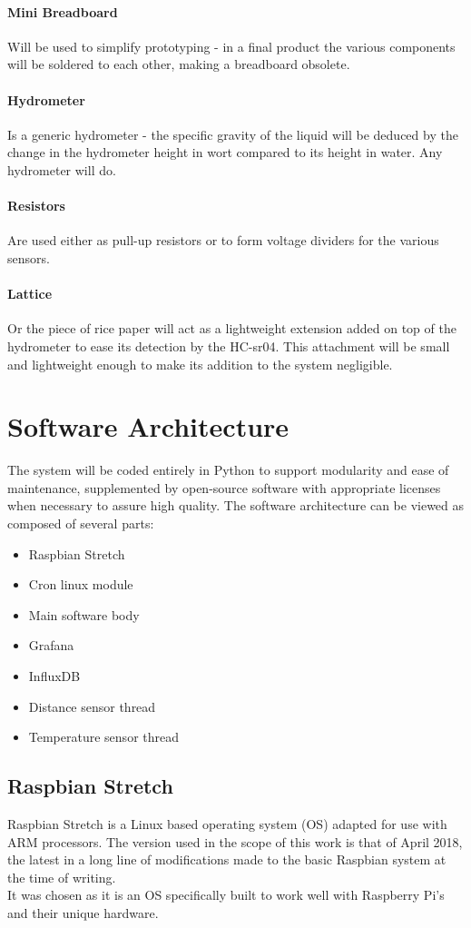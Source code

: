 \documentclass[twoside]{ctuthesis}
\theoremstyle{plain}
\theoremstyle{definition}
\theoremstyle{note}
\begin{document}
\paragraph{Mini Breadboard} Will be used to simplify prototyping - in a final product the various components will be soldered to each other, making a breadboard obsolete.
\paragraph{Hydrometer} Is a generic hydrometer - the specific gravity of the liquid will be deduced by the change in the hydrometer height in wort compared to its height in water. Any hydrometer will do.
\paragraph{Resistors} Are used either as pull-up resistors or to form voltage dividers for the various sensors.
\paragraph{Lattice} Or the piece of rice paper will act as a lightweight extension added on top of the hydrometer to ease its detection by the HC-sr04. This attachment will be small and lightweight enough to make its addition to the system negligible.

\section{Software Architecture}
The system will be coded entirely in Python to support modularity and ease of maintenance, supplemented by open-source software with appropriate licenses when necessary to assure high quality. The software architecture can be viewed as composed of several parts:\\

\begin{itemize}
	\item Raspbian Stretch
	\item Cron linux module
	\item Main software body
	\item Grafana 
	\item InfluxDB
	\item Distance sensor thread
	\item Temperature sensor thread
\end{itemize}

\subsection{Raspbian Stretch}
Raspbian Stretch is a Linux based operating system (OS) adapted for use with ARM processors. The version used in the scope of this work is that of April 2018, the latest in a long line of modifications made to the basic Raspbian system at the time of writing.\\
It was chosen as it is an OS specifically built to work well with Raspberry Pi's and their unique hardware.
\end{document}
